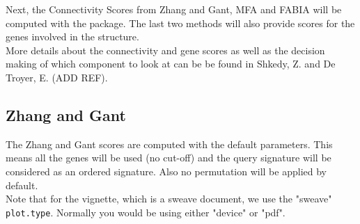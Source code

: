 \documentclass[a4paper]{article}\usepackage[]{graphicx}\usepackage[]{color}
\begin{document}
\noindent Next, the Connectivity Scores from Zhang and Gant, MFA and FABIA will
be computed with the package. The last two methods will also provide scores for the
genes involved in the structure.\\
More details about the connectivity and gene scores as well as the decision
making of which component to look at can be be found in Shkedy, Z. and De
Troyer, E. (ADD REF).

\subsection{Zhang and Gant}
The Zhang and Gant scores are computed with the default parameters. This means
all the genes will be used (no cut-off) and the query signature will be
considered as an ordered signature. Also no permutation will be applied by
default.
\\Note that for the vignette, which is a
sweave document, we use the "sweave" \texttt{plot.type}. Normally you would be
using either "device" or "pdf".
\end{document}
